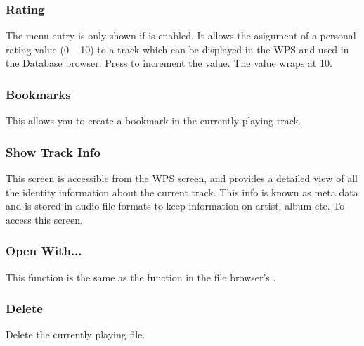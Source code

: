 \subsubsection{Rating}
The menu entry is only shown if  is
enabled. It allows the asignment of a personal rating value (0 -- 10)
to a track which can be displayed in the WPS and used in the Database
browser. Press \ButtonRight{} to increment the value. The value wraps at 10.

\subsubsection{Bookmarks}
This allows you to create a bookmark in the currently-playing track.

\subsubsection{\label{ref:trackinfoviewer}Show Track Info}
This screen is accessible from the WPS screen, and provides a detailed view of
all the identity information about the current track. This info is known as
meta data and is stored in audio file formats to keep information on artist,
album etc. To access this screen, %
%
%
%

\subsubsection{Open With...}
This  function is the same as the  
function in the file browser's \setting{Context Menu}.

\subsubsection{Delete}
Delete the currently playing file.

